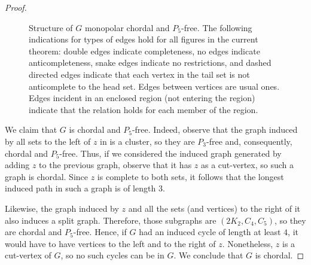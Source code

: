 \begin{proof}
\begin{figure}[htb!]
        \caption{Structure of $G$ monopolar chordal and $P_5$-free. The
            following indications for types of edges hold for all figures in the
            current theorem: double edges indicate completeness, no edges
            indicate anticompleteness, snake edges indicate no restrictions, and
            dashed directed edges indicate that each vertex in the tail set is
            not anticomplete to the head set. Edges between vertices are usual
            ones. Edges incident in an enclosed region (not entering the region)
            indicate that the relation holds for each member of the region.}
        \label{fig:chordal_structure_1}
    \end{figure}

    We claim that $G$ is chordal and $P_5$-free. Indeed, observe that the graph
    induced by all sets to the left of $z$ in  is
    a cluster, so they are $P_3$-free and, consequently, chordal and $P_5$-free.
    Thus, if we considered the induced graph generated by adding $z$ to the
    previous graph, observe that it has $z$ as a cut-vertex, so such a graph is
    chordal. Since $z$ is complete to both sets, it follows that the longest
    induced path in such a graph is of length $3$.
    
    Likewise, the graph induced by $z$ and all the sets (and vertices)
    to the right of it also induces a split graph. Therefore, those subgraphs
    are $(2K_2,C_4,C_5)$, so they are chordal and $P_5$-free. Hence, if $G$ had
    an induced cycle of length at least $4$, it would have to have vertices to
    the left and to the right of $z$. Nonetheless, $z$ is a cut-vertex of $G$,
    so no such cycles can be in $G$. We conclude that $G$ is chordal.  
    

\end{proof}

